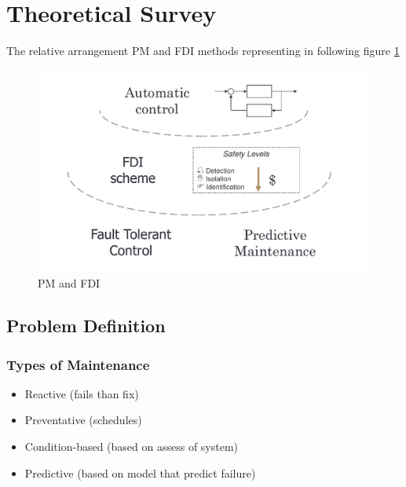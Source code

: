\documentclass[class=article, crop=false]{standalone}
\begin{document}
\tableofcontents

% 
\section{Theoretical Survey}
The relative arrangement PM and FDI methods representing in following
figure \ref{fig:fdi_pm}
\begin{figure}[h!]
    \centering
    \includegraphics[scale=0.3]{FDI_PM.png}
    \caption{PM and FDI }
    \label{fig:fdi_pm}
\end{figure}

% 

\subsection{Problem Definition}
\subsubsection{Types of Maintenance}

\begin{itemize}
    \item{Reactive (fails than fix)}
    \item{Preventative (schedules)}
    \item{Condition-based (based on assess of system)}
    \item{Predictive (based on model that predict failure)}
\end{itemize}
\end{document}
